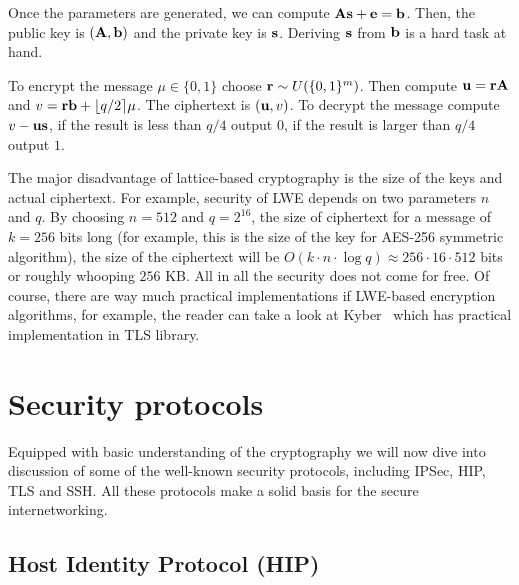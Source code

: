Once the parameters are generated, we can compute ${\bf As}+{\bf e} = {\bf b}$. Then, the public 
key is $({\bf A, b})$ and the private key is ${\bf s}$. Deriving ${\bf s}$ from ${\bf b}$ is a hard 
task at hand.

To encrypt the message $\mu \in \{0, 1\}$ choose ${\bf r} \sim U(\{0, 1\}^m)$. Then compute ${\bf u}={\bf rA}$ and 
$v={\bf rb}+\lfloor q/2 \rceil \mu$. The ciphertext is $({\bf u}, v)$. To decrypt the message 
compute $v - \bf{u s}$, if the result is less than $q/4$ output $0$, if the result
is larger than $q/4$ output $1$. 

The major disadvantage of lattice-based cryptography is the size of the keys and actual ciphertext. For example,
security of LWE depends on two parameters $n$ and $q$. By choosing $n=512$ and $q=2^{16}$, the size of ciphertext
for a message of $k=256$ bits long (for example, this is the size of the key for AES-256 symmetric algorithm), 
the size of the ciphertext will be $O(k \cdot n \cdot \log q) \approx 256 \cdot 16 \cdot 512$ bits or roughly whooping 
$256$ KB. All in all the security does not come for free. Of course, there are way much practical implementations
if LWE-based encryption algorithms, for example, the reader can take a look at Kyber~\cite{nist:kyber} which has practical 
implementation in TLS library.

\section{Security protocols}

Equipped with basic understanding of the cryptography we will now dive into discussion of some 
of the well-known security protocols, including IPSec, HIP, TLS and SSH. All these protocols
make a solid basis for the secure internetworking.

\subsection{Host Identity Protocol (HIP)}

